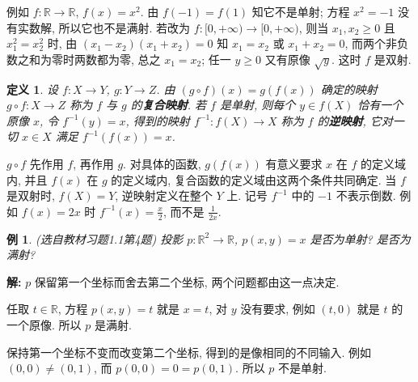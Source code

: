 \documentclass[UTF8,openany]{ctexbook}
\theoremstyle{chinesetextbook}
\newtheorem{definition}{定义}[section]
\newtheorem{example}{例}[section]
\newenvironment{cnsolution}{\par\indent\textbf{解:} \ignorespaces}{\par}
\begin{document}
例如 $f:\mathbb R\to\mathbb R$, $f(x)=x^2$. 由 $f(-1)=f(1)$ 知它不是单射; 方程 $x^2=-1$ 没有实数解, 所以它也不是满射. 若改为 $f:[0,+\infty)\to[0,+\infty)$, 则当 $x_1,x_2\ge0$ 且 $x_1^2=x_2^2$ 时, 由 $(x_1-x_2)(x_1+x_2)=0$ 知 $x_1=x_2$ 或 $x_1+x_2=0$, 而两个非负数之和为零时两数都为零, 总之 $x_1=x_2$; 任一 $y\ge0$ 又有原像 $\sqrt y$. 这时 $f$ 是双射.
\begin{definition}
设 $f:X\to Y$, $g:Y\to Z$. 由 $(g\circ f)(x)=g(f(x))$ 确定的映射 $g\circ f:X\to Z$ 称为 $f$ 与 $g$ 的\textbf{复合映射}. 若 $f$ 是单射, 则每个 $y\in f(X)$ 恰有一个原像 $x$, 令 $f^{-1}(y)=x$, 得到的映射 $f^{-1}:f(X)\to X$ 称为 $f$ 的\textbf{逆映射}, 它对一切 $x\in X$ 满足 $f^{-1}(f(x))=x$.
\end{definition}
$g\circ f$ 先作用 $f$, 再作用 $g$. 对具体的函数, $g(f(x))$ 有意义要求 $x$ 在 $f$ 的定义域内, 并且 $f(x)$ 在 $g$ 的定义域内, 复合函数的定义域由这两个条件共同确定. 当 $f$ 是双射时, $f(X)=Y$, 逆映射定义在整个 $Y$ 上. 记号 $f^{-1}$ 中的 $-1$ 不表示倒数. 例如 $f(x)=2x$ 时 $\displaystyle f^{-1}(x)=\frac x2$, 而不是 $\displaystyle\frac1{2x}$.
\begin{example}
\textnormal{(选自教材习题1.1第4题)} 投影 $p:\mathbb R^2\to\mathbb R$, $p(x,y)=x$ 是否为单射? 是否为满射?
\end{example}
\begin{cnsolution}
$p$ 保留第一个坐标而舍去第二个坐标, 两个问题都由这一点决定.

任取 $t\in\mathbb R$, 方程 $p(x,y)=t$ 就是 $x=t$, 对 $y$ 没有要求, 例如 $(t,0)$ 就是 $t$ 的一个原像. 所以 $p$ 是满射.

保持第一个坐标不变而改变第二个坐标, 得到的是像相同的不同输入. 例如 $(0,0)\ne(0,1)$, 而 $p(0,0)=0=p(0,1)$. 所以 $p$ 不是单射.
\end{cnsolution}
\end{document}
